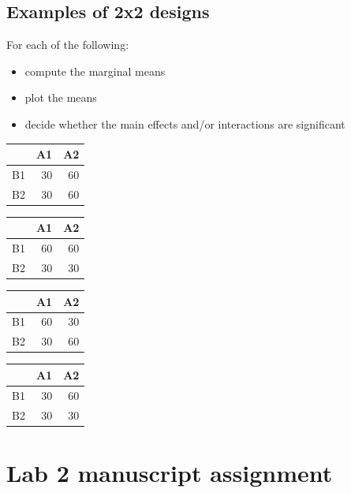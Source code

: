 \documentclass[article,10pt]{article}
\begin{document}
\subsection*{Examples of 2x2 designs}
\label{sec-3-3}

For each of the following:
\begin{itemize}
\item compute the marginal means
\item plot the means
\item decide whether the main effects and/or interactions are significant
\end{itemize}

\begin{center}
\begin{tabular}{lrr}
 & A1 & A2\\
\hline
B1 & 30 & 60\\
B2 & 30 & 60\\
\end{tabular}
\end{center}

\begin{center}
\begin{tabular}{lrr}
 & A1 & A2\\
\hline
B1 & 60 & 60\\
B2 & 30 & 30\\
\end{tabular}
\end{center}

\begin{center}
\begin{tabular}{lrr}
 & A1 & A2\\
\hline
B1 & 60 & 30\\
B2 & 30 & 60\\
\end{tabular}
\end{center}

\begin{center}
\begin{tabular}{lrr}
 & A1 & A2\\
\hline
B1 & 30 & 60\\
B2 & 30 & 30\\
\end{tabular}
\end{center}


\section*{Lab 2 manuscript assignment}
\label{sec-4}
\end{document}
